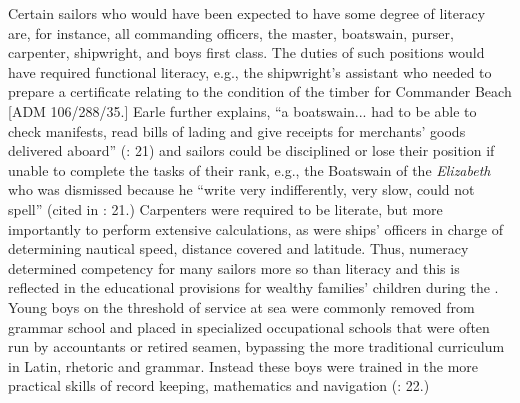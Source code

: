 Certain sailors who would have been expected to have some degree of literacy are, for instance, all commanding officers, the master, boatswain, purser, carpenter, shipwright, and boys first class. The duties of such positions would have required functional literacy, e.g., the shipwright’s assistant who needed to prepare a certificate relating to the condition of the timber for Commander Beach [ADM 106/288/35.] Earle further explains, “a boatswain... had to be able to check manifests, read bills of lading and give receipts for merchants’ goods delivered aboard” (\citeyear*{Earle1998}: 21) and sailors could be disciplined or lose their position if unable to complete the tasks of their rank, e.g., the Boatswain of the \textit{Elizabeth} who was dismissed because he “write very indifferently, very slow, could not spell” (cited in \citealt{Earle1998}: 21.) Carpenters were required to be literate, but more importantly to perform extensive calculations, as were ships’ officers in charge of determining nautical speed, distance covered and latitude. Thus, numeracy determined competency for many sailors more so than literacy and this is reflected in the educational provisions for wealthy families’ children during the . Young boys on the threshold of service at sea were commonly removed from grammar school and placed in specialized occupational schools that were often run by accountants or retired seamen, bypassing the more traditional curriculum in Latin, rhetoric and grammar.  Instead these boys were trained in the more practical skills of record keeping, mathematics and navigation (\citealt{Earle1998}: 22.) 

